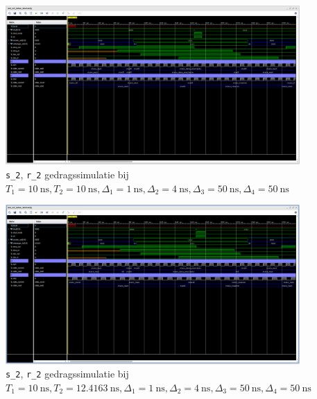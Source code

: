 \documentclass[titlepage]{article}
\begin{document}
\begin{figure}[htpb]
    \centering
    \includegraphics[trim={0 375px 0 0}, clip, width =\linewidth]{sr2_gedragssimulatie_10_10_1_4_50_50.PNG}
    \caption{\texttt{s\_2}, \texttt{r\_2} gedragssimulatie bij \(T_1 = \SI{10}{\nano\second}, T_2 = \SI{10}{\nano\second},
    \Delta_1 = \SI{1}{\nano\second}, \Delta_2 = \SI{4}{\nano\second}, \Delta_3 = \SI{50}{\nano\second}, \Delta_4 = \SI{50}{\nano\second} \)}
    \label{fig:sr2_behav_10_10_1_4_50_50}
\end{figure}

\begin{figure}[htpb]
    \centering
    \includegraphics[trim={0 375px 0 0}, clip, width =\linewidth]{sr2_gedragssimulatie_10_12_1_4_50_50.PNG}
    \caption{\texttt{s\_2}, \texttt{r\_2} gedragssimulatie bij \(T_1 = \SI{10}{\nano\second}, T_2 = \SI{12.4163}{\nano\second},
    \Delta_1 = \SI{1}{\nano\second}, \Delta_2 = \SI{4}{\nano\second}, \Delta_3 = \SI{50}{\nano\second}, \Delta_4 = \SI{50}{\nano\second} \)}
    \label{fig:sr2_behav_10_12_1_4_50_50}
\end{figure}
\end{document}
